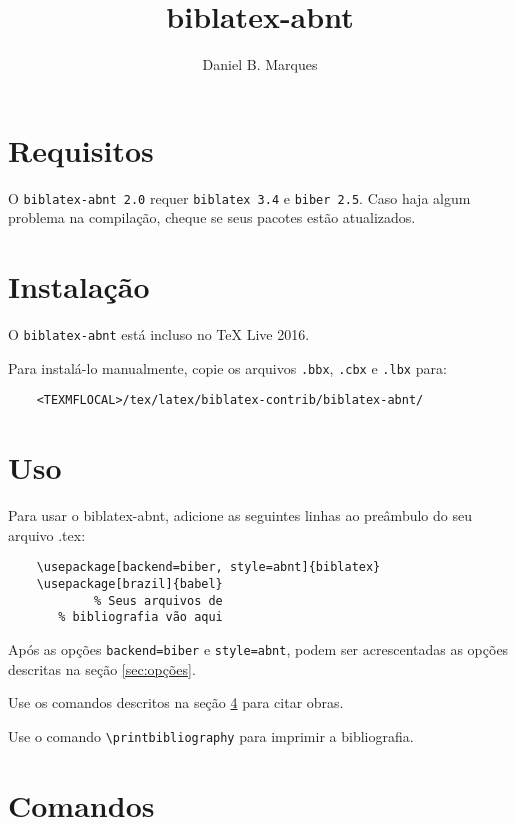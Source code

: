 \documentclass[a4paper]{article}
\title{biblatex-abnt \version}
\author{Daniel B. Marques}
\newcommand{\version}{2.0}
\newcommand{\requirements}{\texttt{biblatex 3.4} e \texttt{biber 2.5}}
\begin{document}
\maketitle

\tableofcontents

\clearpage
\section{Requisitos}

O \texttt{biblatex-abnt \version} requer \requirements. Caso haja algum problema na compilação, cheque se seus pacotes estão atualizados.

\section{Instalação}

O \texttt{biblatex-abnt} está incluso no TeX Live 2016.

Para instalá-lo manualmente, copie os arquivos \texttt{.bbx}, \texttt{.cbx} e \texttt{.lbx} para:
\begin{verbatim}
    <TEXMFLOCAL>/tex/latex/biblatex-contrib/biblatex-abnt/
\end{verbatim}

\section{Uso}

Para usar o {biblatex-abnt}, adicione as seguintes linhas ao preâmbulo do seu arquivo {.tex}:

\begin{verbatim}
    \usepackage[backend=biber, style=abnt]{biblatex}
    \usepackage[brazil]{babel}
            % Seus arquivos de
       % bibliografia vão aqui
\end{verbatim}

Após as opções \texttt{backend=biber} e \texttt{style=abnt}, podem ser acrescentadas as opções descritas na seção \ref{sec:opções}.

Use os comandos descritos na seção \ref{sec:comandos} para citar obras.

Use o comando \verb"\printbibliography" para imprimir a bibliografia.

\clearpage
\section{Comandos}
\label{sec:comandos}
\end{document}
